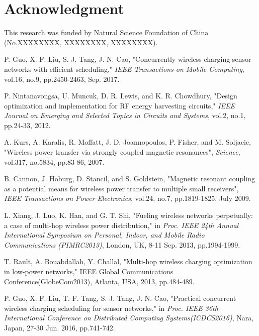 \documentclass[journal,10pt]{IEEEtran}
\begin{document}
\section*{Acknowledgment}
This research was funded by Natural Science Foundation of China (No.XXXXXXXX, XXXXXXXX, XXXXXXXX).

\ifCLASSOPTIONcaptionsoff
  \newpage
\fi


\begin{thebibliography}{11}

P. Guo, X. F. Liu, S. J. Tang, J. N. Cao, "Concurrently wireless charging sensor networks with efficient scheduling," \textit{IEEE Transactions on Mobile Computing}, vol.16, no.9, pp.2450-2463, Sep. 2017.

P. Nintanavongsa, U. Muncuk, D. R. Lewis, and K. R. Chowdhury, "Design optimization and implementation for RF energy harvesting circuits," \textit{IEEE Journal on Emerging and Selected Topics in Circuits and Systems}, vol.2, no.1, pp.24-33, 2012.

A. Kurs, A. Karalis, R. Moffatt, J. D. Joannopoulos, P. Fisher, and M. Soljacic, "Wireless power transfer via strongly coupled magnetic resonances", \textit{Science}, vol.317, no.5834, pp.83-86, 2007.

B. Cannon, J. Hoburg, D. Stancil, and S. Goldstein, "Magnetic resonant coupling as a potential means for wireless power transfer to multiple small receivers", \textit{IEEE Transactions on Power Electronics}, vol.24, no.7, pp.1819-1825, July 2009.

L. Xiang, J. Luo, K. Han, and G. T. Shi, "Fueling wireless networks perpetually: a case of multi-hop wireless power distribution," in \textit{Proc. IEEE 24th Annual International Symposium on Personal, Indoor, and Mobile Radio Communications (PIMRC2013)}, London, UK, 8-11 Sep. 2013, pp.1994-1999.

T. Rault, A. Bouabdallah, Y. Challal, "Multi-hop wireless charging optimization in low-power networks," IEEE Global Communications Conference(GlobeCom2013), Atlanta, USA, 2013, pp.484-489.

P. Guo, X. F. Liu, T. F. Tang, S. J. Tang, J. N. Cao, "Practical concurrent wireless charging scheduling for sensor networks," in \textit{Proc. IEEE 36th International Conference on Distributed Computing Systems(ICDCS2016)}, Nara, Japan, 27-30 Jun. 2016, pp.741-742.


\end{thebibliography}
\end{document}
